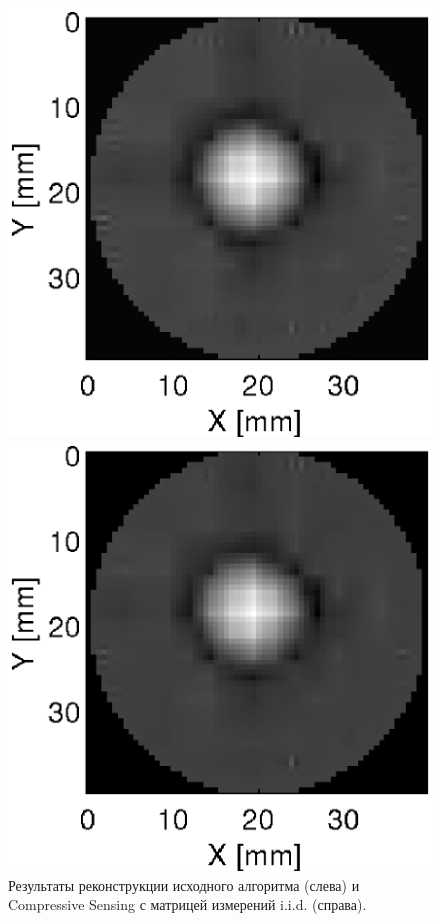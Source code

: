 \documentclass[14pt]{matmex-diploma-custom}
\begin{document}
\begin{figure}[!tbp]
    \centering
    \begin{minipage}[b]{0.45\textwidth}
        \includegraphics[width=\textwidth]{pics_eps/slice_base_grad.eps}
    \end{minipage}
    \hfill
    \begin{minipage}[b]{0.45\textwidth}
        \includegraphics[width=\textwidth]{pics_eps/slice_cs_grad.eps}
    \end{minipage}
    \caption{\small Результаты реконструкции исходного алгоритма (слева) и Compressive Sensing с матрицей измерений i.i.d. (справа).}
    \label{fig:reconstruction_exp1}
\end{figure}
\end{document}
